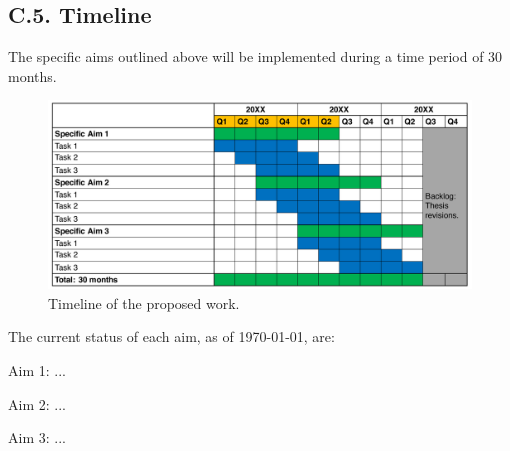 \subsection{C.5. Timeline}

\vspace{1cm}
The specific aims outlined above will be implemented during a time period of 30 months. 

\begin{figure}[H]
\centering
\includegraphics[width=17.5cm]{figs/timeline.pdf}
\caption{\footnotesize{Timeline of the proposed work.}}
\label{Fig: timeline}
\end{figure}

The current status of each aim, as of \today, are:

Aim 1: ...

Aim 2: ...

Aim 3: ...